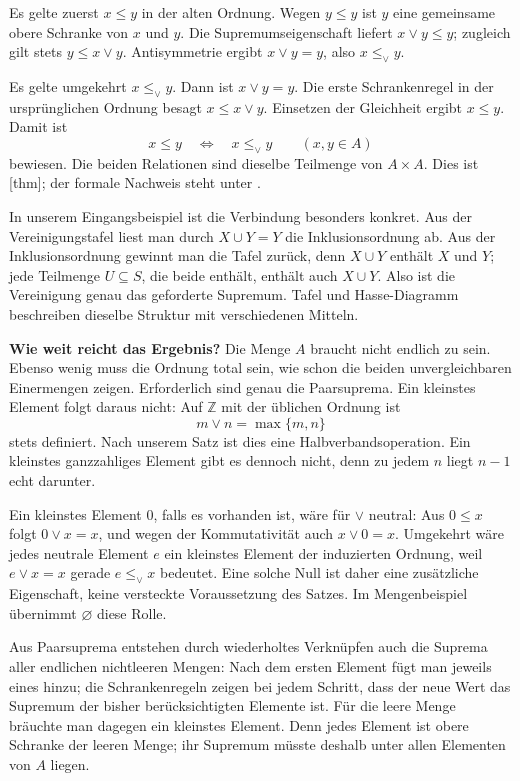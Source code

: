 Es gelte zuerst \(x\leq y\) in der alten Ordnung.
Wegen \(y\leq y\) ist \(y\) eine gemeinsame obere Schranke
von \(x\) und \(y\). Die Supremumseigenschaft liefert
\(x\vee y\leq y\); zugleich gilt stets \(y\leq x\vee y\).
Antisymmetrie ergibt \(x\vee y=y\), also \(x\leq_\vee y\).

Es gelte umgekehrt \(x\leq_\vee y\). Dann ist
\(x\vee y=y\). Die erste Schrankenregel in der ursprünglichen
Ordnung besagt \(x\leq x\vee y\). Einsetzen der Gleichheit
ergibt \(x\leq y\). Damit ist
\[
  x\leq y\quad\Longleftrightarrow\quad x\leq_\vee y
  \qquad(x,y\in A)
\]
bewiesen. Die beiden Relationen sind dieselbe Teilmenge von
\(A\times A\). Dies ist
[thm]; der formale Nachweis steht unter
.

\SemilatticeCorrespondenceDiagram

In unserem Eingangsbeispiel ist die Verbindung besonders konkret.
Aus der Vereinigungstafel liest man durch \(X\cup Y=Y\)
die Inklusionsordnung ab. Aus der Inklusionsordnung gewinnt man
die Tafel zurück, denn \(X\cup Y\) enthält \(X\) und
\(Y\); jede Teilmenge \(U\subseteq S\), die beide enthält,
enthält auch \(X\cup Y\). Also ist die Vereinigung genau
das geforderte Supremum. Tafel und Hasse-Diagramm beschreiben
dieselbe Struktur mit verschiedenen Mitteln.

\medskip\noindent\textbf{Wie weit reicht das Ergebnis?}
Die Menge \(A\) braucht nicht endlich zu sein. Ebenso wenig
muss die Ordnung total sein, wie schon die beiden unvergleichbaren
Einermengen zeigen. Erforderlich sind genau die Paarsuprema.
Ein kleinstes Element folgt daraus nicht: Auf \(\mathbb Z\)
mit der üblichen Ordnung ist
\[
  m\vee n=\max\{m,n\}
\]
stets definiert. Nach unserem Satz ist dies eine Halbverbandsoperation.
Ein kleinstes ganzzahliges Element gibt es dennoch nicht, denn
zu jedem \(n\) liegt \(n-1\) echt darunter.

Ein kleinstes Element \(0\), falls es vorhanden ist, wäre für
\(\vee\) neutral: Aus \(0\leq x\) folgt \(0\vee x=x\),
und wegen der Kommutativität auch \mbox{\(x\vee0=x\)}. Umgekehrt
wäre jedes neutrale Element \(e\) ein kleinstes Element der
induzierten Ordnung, weil \(e\vee x=x\) gerade
\(e\leq_\vee x\) bedeutet. Eine solche Null ist daher eine
zusätzliche Eigenschaft, keine versteckte Voraussetzung des Satzes.
Im Mengenbeispiel übernimmt \(\varnothing\) diese Rolle.

Aus Paarsuprema entstehen durch wiederholtes Verknüpfen auch die
Suprema aller endlichen nichtleeren Mengen: Nach dem ersten
Element fügt man jeweils eines hinzu; die Schrankenregeln zeigen
bei jedem Schritt, dass der neue Wert das Supremum der bisher
berücksichtigten Elemente ist. Für die leere Menge bräuchte man
dagegen ein kleinstes Element. Denn jedes Element ist obere
Schranke der leeren Menge; ihr Supremum müsste deshalb unter
allen Elementen von \(A\) liegen.

